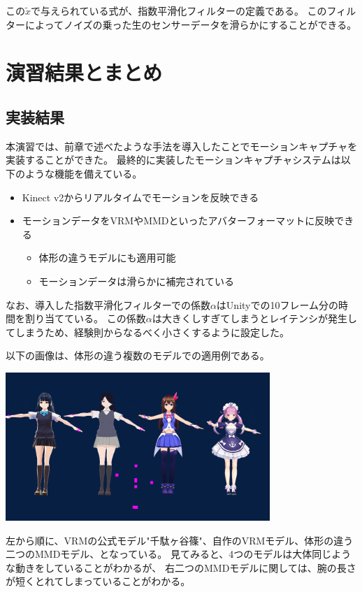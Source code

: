 \documentclass[a4j]{jsarticle}
\begin{document}
この$\tilde{x}$で与えられている式が、指数平滑化フィルターの定義である。
このフィルターによってノイズの乗った生のセンサーデータを滑らかにすることができる。

\section{演習結果とまとめ}

\subsection{実装結果}

本演習では、前章で述べたような手法を導入したことでモーションキャプチャを実装することができた。
最終的に実装したモーションキャプチャシステムは以下のような機能を備えている。

\begin{itemize}
  \item Kinect v2からリアルタイムでモーションを反映できる
  \item モーションデータをVRMやMMDといったアバターフォーマットに反映できる
  \begin{itemize}
  \item 体形の違うモデルにも適用可能
  \item モーションデータは滑らかに補完されている
  \end{itemize}
\end{itemize}

なお、導入した指数平滑化フィルターでの係数$\alpha$はUnityでの10フレーム分の時間を割り当てている。
この係数$\alpha$は大きくしすぎてしまうとレイテンシが発生してしまうため、経験則からなるべく小さくするように設定した。

以下の画像は、体形の違う複数のモデルでの適用例である。

\includegraphics[width=10cm]{img/kekka.png}

左から順に、VRMの公式モデル"千駄ヶ谷篠"、自作のVRMモデル、体形の違う二つのMMDモデル、となっている。
見てみると、4つのモデルは大体同じような動きをしていることがわかるが、
右二つのMMDモデルに関しては、腕の長さが短くとれてしまっていることがわかる。
\end{document}
